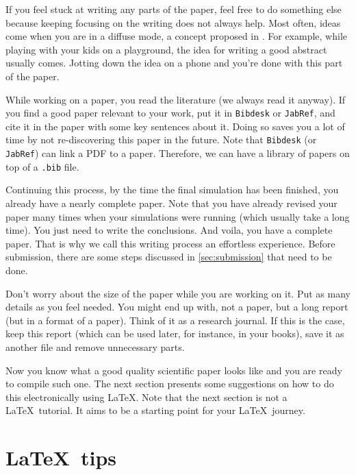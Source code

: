 \documentclass[authoryear,12pta4paper,fleqn]{article}
\numberwithin{equation}{section}
\theoremstyle{remark}
\begin{document}
If you feel stuck at writing any parts of the paper, feel free to do something else because keeping focusing on the writing does not always help. Most often, ideas come when you are in a diffuse mode, a concept proposed in \cite{Oakley:2018a}. For example, while playing with your kids on a playground, the idea for writing a good abstract usually comes. Jotting down the idea on a phone and you're done with this part of the paper.

While working on a paper, you read the literature (we always read it anyway). If you find a good paper relevant to your work, put it in \texttt{Bibdesk} or \texttt{JabRef}, and cite it in the paper with some key sentences about it. Doing so saves you a lot of time by not re-discovering this paper in the future. Note that \texttt{Bibdesk} (or \texttt{JabRef}) can link a PDF to a paper. Therefore, we can have a library of papers on top of a \texttt{.bib} file. 

Continuing this process, by the time the final simulation has been finished, you already have a nearly complete paper. Note that you have already revised your paper many times when your simulations were running (which usually take a long time).
You just need to write the conclusions. And voila, you have a complete paper. That is why we call this writing process an effortless experience.
Before submission, there are some steps discussed in \cref{sec:submission} that need to be done.

Don't worry about the size of the paper while you are working on it. Put as many details as you feel needed. You might end up with, not a paper, but a long report (but in a format of a paper). Think of it as a research journal. If this is the case, keep this report (which can be used later, for instance, in your books), save it as another  file and remove unnecessary parts.

Now you know what a good quality scientific paper looks like and you are ready to compile such one. The next section presents some suggestions on how to do this electronically using \LaTeX. Note that the next section is not a \LaTeX\ tutorial. It aims to be a starting point for your \LaTeX\ journey.

% 


\section{\LaTeX\ tips}\label{sec:latex}
\end{document}

